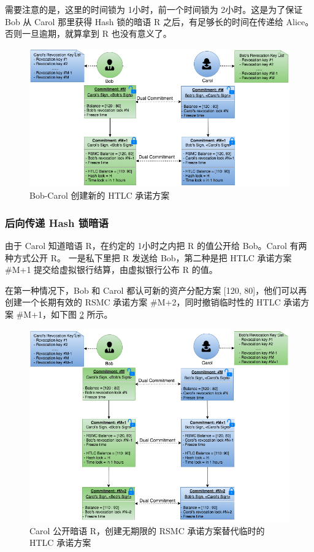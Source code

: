 \begin{appendices}
需要注意的是，这里的时间锁为 1小时，前一个时间锁为 2小时。这是为了保证 Bob 从 Carol 那里获得 Hash 锁的暗语 R 之后，有足够长的时间在传递给 Alice。否则一旦逾期，就算拿到 R 也没有意义了。

\begin{figure}[h!]
    \centering
    \includegraphics[width=12cm, keepaspectratio]{../images/bob_carol_2.png}
    \caption{Bob-Carol 创建新的 HTLC 承诺方案}
    \label{fig:A_bob_carol_2}
\end{figure}

\subsubsection{后向传递 Hash 锁暗语}
由于 Carol 知道暗语 R，在约定的 1小时之内把 R 的值公开给 Bob。Carol 有两种方式公开 R。
一是私下里把 R 发送给 Bob，第二种是把 HTLC 承诺方案 \#M+1 提交给虚拟银行结算，由虚拟银行公布 R 的值。

在第一种情况下，Bob 和 Carol 都认可新的资产分配方案 [120, 80]，他们可以再创建一个长期有效的 RSMC 承诺方案 \#M+2，同时撤销临时性的 HTLC 承诺方案 \#M+1，如下图 \ref{fig:A_bob_carol_3} 所示。

\begin{figure}[h!]
    \centering
    \includegraphics[width=12cm, keepaspectratio]{../images/bob_carol_3.png}
    \caption{Carol 公开暗语 R，创建无期限的 RSMC 承诺方案替代临时的 HTLC 承诺方案}
    \label{fig:A_bob_carol_3}
\end{figure}


\end{appendices}
